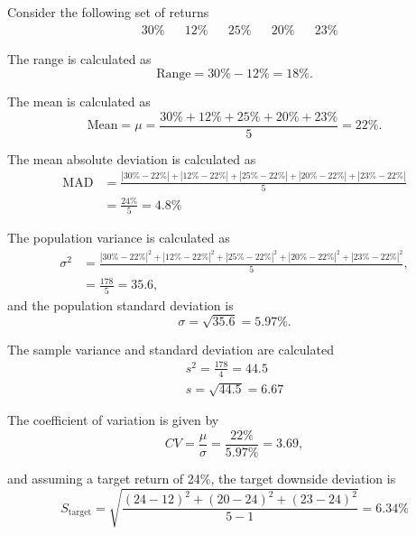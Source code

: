 \documentclass[../notes_compiled.tex]{subfiles}
\begin{document}
\begin{itemize}
{\color{RedViolet}
\item Consider the following set of returns
\begin{align*}
&30\% &&12\% &&25\% &&20\% &&23\%
\end{align*}
}
{\color{RoyalBlue}
The range is calculated as
\begin{equation*}
\text{Range} = 30\% - 12\% = 18\%.
\end{equation*}

The mean is calculated as
\begin{equation*}
\text{Mean} = \mu = \frac{30\% + 12\% + 25\% + 20\% + 23\%}{5} = 22\%.
\end{equation*}

The mean absolute deviation is calculated as
\begin{align*}
\text{MAD} &= \frac{|30\%-22\%| + |12\% - 22\%| + |25\% - 22\%| + |20\% - 22\%| + |23\% - 22\%|}{5} \\
&=\frac{24\%}{5} = 4.8\%
\end{align*}

The population variance is calculated as
\begin{align*}
\sigma^{2} &= \frac{|30\%-22\%|^{2} + |12\% - 22\%|^{2} + |25\% - 22\%|^{2} + |20\% - 22\%|^{2} + |23\% - 22\%|^{2}}{5}, \\
&=\frac{178}{5} = 35.6,
\end{align*}
and the population standard deviation is
\begin{equation*}
\sigma = \sqrt{35.6} = 5.97\%.
\end{equation*}

The sample variance and standard deviation are calculated
\begin{gather*}
s^{2} = \frac{178}{4} = 44.5 \\
s = \sqrt{44.5} = 6.67
\end{gather*}

The coefficient of variation is given by 
\begin{equation*}
CV = \frac{\mu}{\sigma} = \frac{22\%}{5.97\%} = 3.69,
\end{equation*}

and assuming a target return of 24\%, the target downside deviation is
\begin{equation*}
S_{\text{target}} = \sqrt{\frac{(24-12)^{2} + (20-24)^{2} + (23-24)^{2}}{5-1}} = 6.34\%
\end{equation*}
}
\end{itemize}
\end{document}
